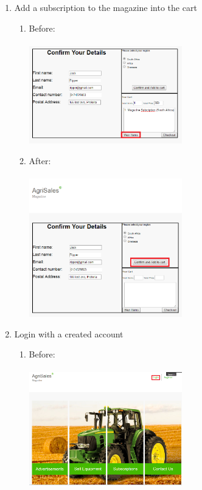 \documentclass[11pt]{article}
\begin{document}
\begin{enumerate}
\begin{enumerate}
			\end{enumerate}
		\item Add a subscription to the magazine into the cart
			\begin{enumerate}
				\item Before: \\ \\
				\includegraphics[width=0.55\textwidth]{../Images/viewItems.png}
				\item After: \\ \\
				\includegraphics[width=0.55\textwidth]{../Images/Subscribe.png}
			\end{enumerate}
		\item Login with a created account
			\begin{enumerate}
				\item Before: \\ \\
				\includegraphics[width=0.55\textwidth]{../Images/login_act2.png}

\end{enumerate}
\end{enumerate}
\end{document}

